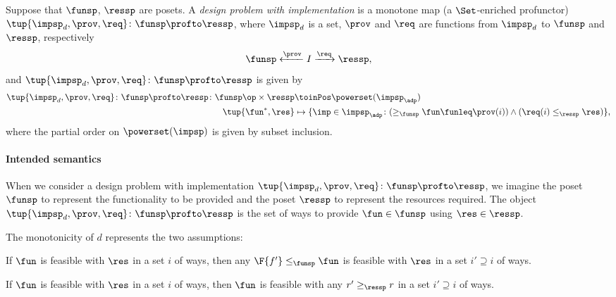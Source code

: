 \begin{definition}
\label{def:dpwithimp}
Suppose that $\funsp$, $\ressp$ are posets. A \emph{design problem with implementation} is a monotone map (a $\Set$-enriched profunctor) $\tup{\impsp_d,\prov,\req}\colon \funsp\profto \ressp$, where $\impsp_d$ is a set, $\prov$ and $\req$ are functions from $\impsp_d$ to $\funsp$ and $\ressp$, respectively
\begin{equation}
\funsp \xleftarrow{\prov} I \xrightarrow{\req} \ressp,
\end{equation}
and $\tup{\impsp_d,\prov,\req}\colon \funsp\profto \ressp$ is given by
\begin{equation}
\begin{aligned}
\tup{\impsp_d,\prov,\req}\colon \funsp\profto \ressp \colon \funsp\op \times \ressp &\toinPos \powerset(\impsp_\adp) \\
\tup{\fun^*, \res} &\mapsto \{ \imp \in \impsp_\adp \colon (\geq_\funsp \fun \funleq \prov(i)) \wedge (\req(i) \leq_\ressp \res) \},
\end{aligned}
\end{equation}
where the partial order on $\powerset(\impsp)$ is given by subset inclusion.
\end{definition}

\paragraph{Intended semantics} When we consider a design problem with implementation $\tup{\impsp_d,\prov,\req}\colon \funsp\profto \ressp$, we imagine the poset $\funsp$ to represent the functionality to be provided and the poset $\ressp$ to represent the resources required. The object $\tup{\impsp_d,\prov,\req}\colon \funsp\profto \ressp$ is the set of ways to provide $\fun\in \funsp$ using $\res\in \ressp$.

\noindent The monotonicity of $d$ represents the two assumptions:
\begin{compactenum}
\item If $\fun$ is feasible with $\res$ in a set $i$ of ways, then any $\F{f'}\leq_\funsp \fun$ is feasible with $\res$ in a set $i'\supseteq i$ of ways.
\item If $\fun$ is feasible with $\res$ in a set $i$ of ways, then $\fun$ is feasible with any $r'\geq_\ressp r$ in a set $i'\supseteq i$ of ways.
\end{compactenum}

